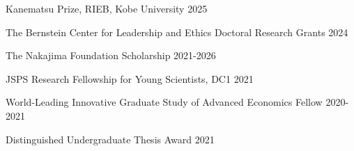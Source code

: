 
\begin{cventries}

\cventrysimple
    {Kanematsu Prize, RIEB, Kobe University}  %
    {2025} %
    {}
	
\cventrysimple
    {The Bernstein Center for Leadership and Ethics Doctoral Research Grants}  %
    {2024} %
    {}
	
\cventrysimple
    {The Nakajima Foundation Scholarship}  %
    {2021-2026} %
    {}
	
\cventrysimple
	{JSPS Research Fellowship for Young Scientists, DC1}  %
    {2021} %
    {}

\cventrysimple
	{World-Leading Innovative Graduate Study of Advanced Economics Fellow}  %
    {2020-2021} %
    {}

\cventrysimple
    {Distinguished Undergraduate Thesis Award}  %
    {2021} %
    {}

\end{cventries}
